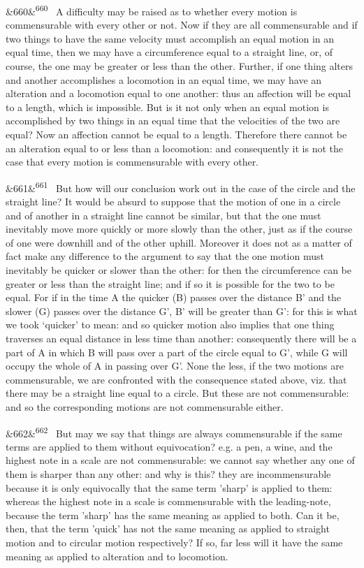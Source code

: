 \documentclass[12pt]{article}
\newcommand{\para}[1][]{\par\noindent\ifx&#1&\else\textsuperscript{\footnotesize #1}~\fi}
\begin{document}
\para[660] A difficulty may be raised as to whether every motion is commensurable with every other or not. Now if they are all commensurable and if two things to have the same velocity must accomplish an equal motion in an equal time, then we may have a circumference equal to a straight line, or, of course, the one may be greater or less than the other. Further, if one thing alters and another accomplishes a locomotion in an equal time, we may have an alteration and a locomotion equal to one another: thus an affection will be equal to a length, which is impossible. But is it not only when an equal motion is accomplished by two things in an equal time that the velocities of the two are equal? Now an affection cannot be equal to a length. Therefore there cannot be an alteration equal to or less than a locomotion: and consequently it is not the case that every motion is commensurable with every other.

\para[661] But how will our conclusion work out in the case of the circle and the straight line? It would be absurd to suppose that the motion of one in a circle and of another in a straight line cannot be similar, but that the one must inevitably move more quickly or more slowly than the other, just as if the course of one were downhill and of the other uphill. Moreover it does not as a matter of fact make any difference to the argument to say that the one motion must inevitably be quicker or slower than the other: for then the circumference can be greater or less than the straight line; and if so it is possible for the two to be equal. For if in the time A the quicker (B) passes over the distance B' and the slower (G) passes over the distance G', B' will be greater than G': for this is what we took ‘quicker’ to mean: and so quicker motion also implies that one thing traverses an equal distance in less time than another: consequently there will be a part of A in which B will pass over a part of the circle equal to G', while G will occupy the whole of A in passing over G'. None the less, if the two motions are commensurable, we are confronted with the consequence stated above, viz. that there may be a straight line equal to a circle. But these are not commensurable: and so the corresponding motions are not commensurable either.

\para[662] But may we say that things are always commensurable if the same terms are applied to them without equivocation? e.g. a pen, a wine, and the highest note in a scale are not commensurable: we cannot say whether any one of them is sharper than any other: and why is this? they are incommensurable because it is only equivocally that the same term 'sharp' is applied to them: whereas the highest note in a scale is commensurable with the leading-note, because the term 'sharp' has the same meaning as applied to both. Can it be, then, that the term 'quick' has not the same meaning as applied to straight motion and to circular motion respectively? If so, far less will it have the same meaning as applied to alteration and to locomotion.
\end{document}
